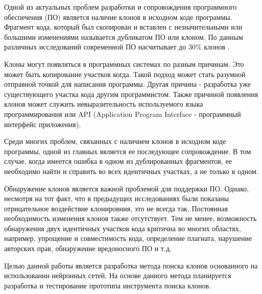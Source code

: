 \intro
Одной из актуальных проблем разработки и сопровождения программного обеспечения (ПО) является наличие клонов в исходном коде программы. Фрагмент кода, который был скопирован и вставлен с незначительными или большими изменениями называется дубликатом ПО или клоном. По данным различных исследований современной ПО насчитывает до 30\% клонов \cite{royandcordy}.

Клоны могут появляться в программных системах по разным причинам. Это может быть копирование участков когда. Такой подход может стать разумной отправной точкой для написания программы. Другая причина - разработка уже существующего участка кода другим программистом. Также причиной появления клонов может служить невыразительность используемого языка программирования или API (Application Program Interface - программный интерфейс приложения).


Среди многих проблем, связанных с наличием клонов в исходном коде программы, одной из главных является ее последующее сопровождение. В том случае, когда имеется ошибка в одном из дублированных фрагментов, ее необходимо найти и справить во всех идентичных участках, а не только в одном.

Обнаружение клонов является важной проблемой для поддержки ПО. Однако, несмотря на тот факт, что в предыдущих исследованиях были показаны отрицательное воздействие клонировния, это не всегда так. Постоянная необходимость изменения клонов также отсутствует. Тем не менее, возможность обнаружения двух идентичных участков кода критична во многих областях, например, упрощение и совместимость кода, определение плагиата, нарушение авторских прав, обнаружение вредоносного ПО и т.д.

Целью данной работы является разработка метода поиска клонов основанного на использовании нейронных сетей. На основе данного метода планируется разработка и тестирование прототипа инструмента поиска клонов.
